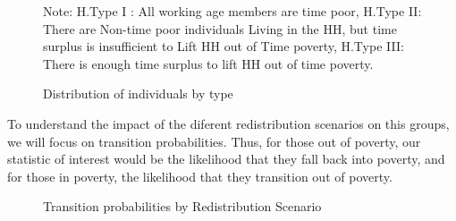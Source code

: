 \documentclass[
  11pt,
]{article}
\begin{document}
\begin{figure}
{\begin{figure}[H]
\begin{minipage}{0.50\linewidth}
{}


\end{minipage}%

\end{figure}%

\footnotesize 

\begin{flushleft}Note: H.Type I : All working age members are time poor, H.Type II: There are Non-time poor individuals Living in the HH, but time surplus is insufficient to Lift HH out of Time poverty, H.Type III: There is enough time surplus to lift HH out of time poverty.\end{flushleft}

}

\caption{\label{fig-dist}Distribution of individuals by type}

\end{figure}%

To understand the impact of the diferent redistribution scenarios on
this groups, we will focus on transition probabilities. Thus, for those
out of poverty, our statistic of interest would be the likelihood that
they fall back into poverty, and for those in poverty, the likelihood
that they transition out of poverty.

\begin{figure}


\caption{\label{fig-transition1}Transition probabilities by
Redistribution Scenario}

\end{figure}%
\end{document}
